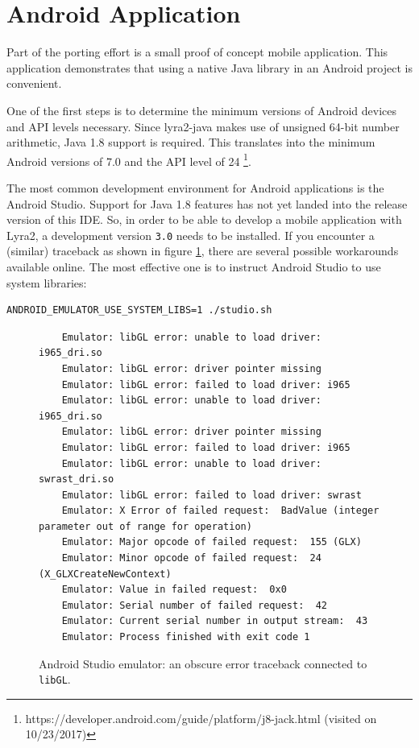 \section{Android Application}
\label{sec:mobile-application}

Part of the porting effort is a small proof of concept mobile application. This application demonstrates that using a native Java library in an Android project is convenient.

One of the first steps is to determine the minimum versions of Android devices and API levels necessary. Since lyra2-java makes use of unsigned 64-bit number arithmetic, Java 1.8 support is required. This translates into the minimum Android versions of 7.0 and the API level of 24 \footnote{https://developer.android.com/guide/platform/j8-jack.html (visited on 10/23/2017)}.

The most common development environment for Android applications is the Android Studio. Support for Java 1.8 features has not yet landed into the release version of this IDE. So, in order to be able to develop a mobile application with Lyra2, a development version \texttt{3.0} needs to be installed. If you encounter a (similar) traceback as shown in figure \ref{fig:traceback}, there are several possible workarounds available online. The most effective one is to instruct Android Studio to use system libraries:

\begin{verbatim}
ANDROID_EMULATOR_USE_SYSTEM_LIBS=1 ./studio.sh
  \end{verbatim}

\begin{figure}
\begin{verbatim}
    Emulator: libGL error: unable to load driver: i965_dri.so
    Emulator: libGL error: driver pointer missing
    Emulator: libGL error: failed to load driver: i965
    Emulator: libGL error: unable to load driver: i965_dri.so
    Emulator: libGL error: driver pointer missing
    Emulator: libGL error: failed to load driver: i965
    Emulator: libGL error: unable to load driver: swrast_dri.so
    Emulator: libGL error: failed to load driver: swrast
    Emulator: X Error of failed request:  BadValue (integer parameter out of range for operation)
    Emulator: Major opcode of failed request:  155 (GLX)
    Emulator: Minor opcode of failed request:  24 (X_GLXCreateNewContext)
    Emulator: Value in failed request:  0x0
    Emulator: Serial number of failed request:  42
    Emulator: Current serial number in output stream:  43
    Emulator: Process finished with exit code 1
\end{verbatim}
\caption{Android Studio emulator: an obscure error traceback connected to \texttt{libGL}.}
\label{fig:traceback}
\end{figure}

